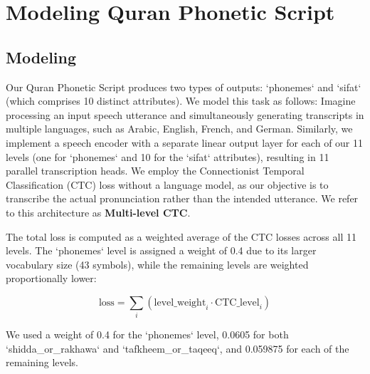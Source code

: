 
\chapter{Modeling Quran Phonetic Script} %

\label{Chapter5} %





\section{Modeling}

Our Quran Phonetic Script produces two types of outputs: `phonemes` and `sifat` (which comprises 10 distinct attributes). We model this task as follows: Imagine processing an input speech utterance and simultaneously generating transcripts in multiple languages, such as Arabic, English, French, and German. Similarly, we implement a speech encoder with a separate linear output layer for each of our 11 levels (one for `phonemes` and 10 for the `sifat` attributes), resulting in 11 parallel transcription heads. We employ the Connectionist Temporal Classification (CTC) loss \cite{graves2006ctc} without a language model, as our objective is to transcribe the actual pronunciation rather than the intended utterance. We refer to this architecture as \textbf{Multi-level CTC}.

The total loss is computed as a weighted average of the CTC losses across all 11 levels. The `phonemes` level is assigned a weight of 0.4 due to its larger vocabulary size (43 symbols), while the remaining levels are weighted proportionally lower:

\begin{equation}
\text{loss} = \sum_{i} \left( \text{level\_weight}_i \cdot \text{CTC\_level}_i \right)
\label{eq:multilevel_ctc}
\end{equation}

We used a weight of 0.4 for the `phonemes` level, 0.0605 for both `shidda_or_rakhawa` and `tafkheem_or_taqeeq`, and 0.059875 for each of the remaining levels.

